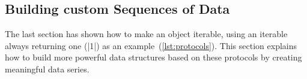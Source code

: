 % 
% 
% 
% 
% 


\subsection{Building custom Sequences of Data}
\label{sub:Building custom Sequences of Data}
The last section has shown how to make an object iterable, using an iterable
always returning one (|1|) as an example~(\ref{lst:protocols}). This section explains how to build more
powerful data structures based on these protocols by creating meaningful data
series.

